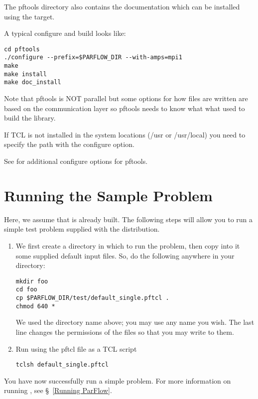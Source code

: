 \begin{enumerate}
The pftools directory also contains the documentation which can be
installed using the  target.

A typical configure and build looks like:

\begin{display}\begin{verbatim}
cd pftools
./configure --prefix=$PARFLOW_DIR --with-amps=mpi1
make 
make install
make doc_install
\end{verbatim}\end{display}

Note that pftools is NOT parallel but some options for how files are
written are based on the communication layer so pftools needs to know
what what used to build the \parflow{} library.

If TCL is not installed in the system locations (/usr or /usr/local) you need
to specify the path with the  configure option.

See  for additional configure options for pftools.

\end{enumerate}


\section{Running the Sample Problem}
\label{Running the Sample Problem}

Here, we assume that \parflow{} is already built.
The following steps will allow you to run a simple test
problem supplied with the distribution.
\begin{enumerate}

\item
We first create a directory in which to run the problem,
then copy into it some supplied default input files.
So, do the following anywhere in your  directory:
\begin{display}\begin{verbatim}
mkdir foo
cd foo
cp $PARFLOW_DIR/test/default_single.pftcl .
chmod 640 *
\end{verbatim}\end{display}
We used the directory name  above;
you may use any name you wish.
The last line changes the permissions of the files so that
you may write to them.

\item
Run \parflow{} using the pftcl file as a TCL script
\begin{display}\begin{verbatim}
tclsh default_single.pftcl
\end{verbatim}\end{display}

\end{enumerate}
You have now successfully run a simple \parflow{} problem.
For more information on running \parflow{},
see \S~\ref{Running ParFlow}.

